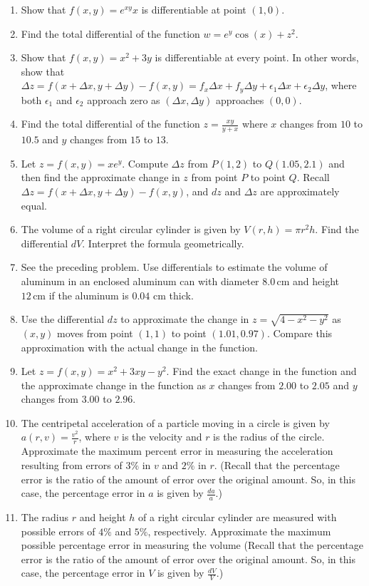 \documentclass{exercises}
\begin{document}
\begin{enumerate}[resume]
\item Show that $f(x,y)=e^{xy}x$ is differentiable at point $(1,0)$.
\item Find the total differential of the function $w=e^{y}\cos(x)+z^{2}$.
\item Show that $f(x,y)=x^{2}+3y$ is differentiable at every point. In other words, show that $\Delta z=f(x+\Delta x,y+\Delta y)-f(x,y)=f_{x}\Delta x+f_{y}\Delta y+\epsilon_{1}\Delta x+\epsilon_{2}\Delta y$, where both $\epsilon_{1}$ and $\epsilon_{2}$ approach zero as $(\Delta x,\Delta y)$ approaches $(0,0)$.
\item Find the total differential of the function $z=\frac{xy}{y+x}$ where $x$ changes from $10$ to $10.5$ and $y$ changes from $15$ to $13$.
\item Let $z=f(x,y)=xe^{y}$. Compute $\Delta z$ from $P(1,2)$ to $Q(1.05,2.1)$ and then find the approximate change in $z$ from point $P$ to point $Q$. Recall $\Delta z=f(x+\Delta x,y+\Delta y)-f(x,y)$, and $dz$ and $\Delta z$ are approximately equal.
\item The volume of a right circular cylinder is given by $V(r,h)=\pi r^{2}h$. Find the differential $dV$. Interpret the formula geometrically.
\item See the preceding problem. Use differentials to estimate the volume of aluminum in an enclosed aluminum can with diameter $8.0\,\text{cm}$ and height $12\,\text{cm}$ if the aluminum is $0.04$ cm thick.
\item Use the differential $dz$ to approximate the change in $z=\sqrt{4-x^{2}-y^{2}}$ as $(x,y)$ moves from point $(1,1)$ to point $(1.01,0.97)$. Compare this approximation with the actual change in the function.
\item Let $z=f(x,y)=x^{2}+3xy-y^{2}$. Find the exact change in the function and the approximate change in the function as $x$ changes from $2.00$ to $2.05$ and $y$ changes from $3.00$ to $2.96$.
\item The centripetal acceleration of a particle moving in a circle is given by $a(r,v)=\frac{v^{2}}{r}$, where $v$ is the velocity and $r$ is the radius of the circle. Approximate the maximum percent error in measuring the acceleration resulting from errors of $3\%$ in $v$ and $2\%$ in $r$. (Recall that the percentage error is the ratio of the amount of error over the original amount. So, in this case, the percentage error in $a$ is given by $\frac{da}{a}$.)
\item The radius $r$ and height $h$ of a right circular cylinder are measured with possible errors of $4\%$ and $5\%$, respectively. Approximate the maximum possible percentage error in measuring the volume (Recall that the percentage error is the ratio of the amount of error over the original amount. So, in this case, the percentage error in $V$ is given by $\frac{dV}{V}$.)

\end{enumerate}
\end{document}
